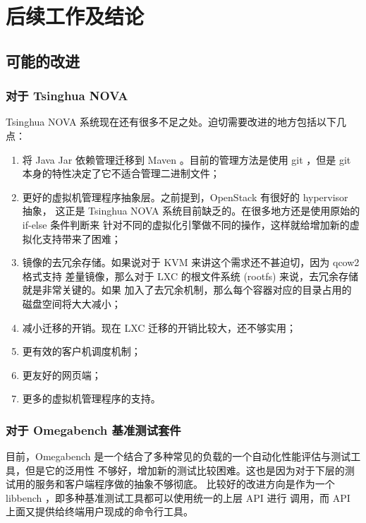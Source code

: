 \chapter{后续工作及结论}

\section{可能的改进}

\subsection{对于 Tsinghua NOVA}

Tsinghua NOVA 系统现在还有很多不足之处。迫切需要改进的地方包括以下几点：

\begin{enumerate}
    \item 将 Java Jar 依赖管理迁移到 Maven 。目前的管理方法是使用 git ，但是 git
    本身的特性决定了它不适合管理二进制文件；
    \item 更好的虚拟机管理程序抽象层。之前提到，OpenStack 有很好的 hypervisor 抽象，
    这正是 Tsinghua NOVA 系统目前缺乏的。在很多地方还是使用原始的 if-else 条件判断来
    针对不同的虚拟化引擎做不同的操作，这样就给增加新的虚拟化支持带来了困难；
    \item 镜像的去冗余存储。如果说对于 KVM 来讲这个需求还不甚迫切，因为 qcow2 格式支持
    差量镜像，那么对于 LXC 的根文件系统 (rootfs) 来说，去冗余存储就是非常关键的。如果
    加入了去冗余机制，那么每个容器对应的目录占用的磁盘空间将大大减小；
    \item 减小迁移的开销。现在 LXC 迁移的开销比较大，还不够实用；
    \item 更有效的客户机调度机制；
    \item 更友好的网页端；
    \item 更多的虚拟机管理程序的支持。
\end{enumerate}

\subsection{对于 Omegabench 基准测试套件}

目前，Omegabench 是一个结合了多种常见的负载的一个自动化性能评估与测试工具，但是它的泛用性
不够好，增加新的测试比较困难。这也是因为对于下层的测试用的服务和客户端程序做的抽象不够彻底。
比较好的改进方向是作为一个 libbench ，即多种基准测试工具都可以使用统一的上层 API 进行
调用，而 API 上面又提供给终端用户现成的命令行工具。

